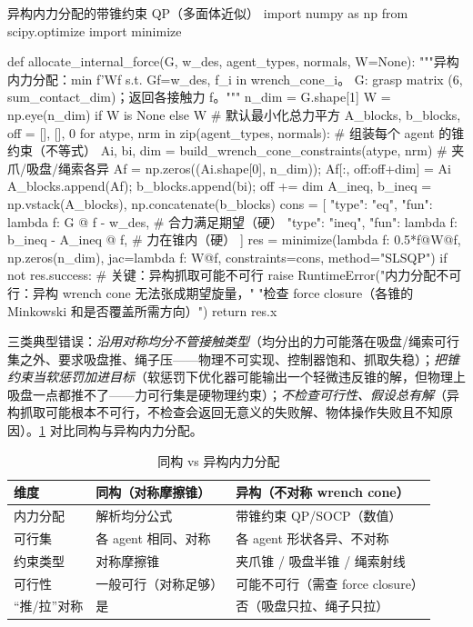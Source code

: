 \begin{codebox}[Python]{异构内力分配的带锥约束 QP（多面体近似）}
import numpy as np
from scipy.optimize import minimize

def allocate_internal_force(G, w_des, agent_types, normals, W=None):
    """异构内力分配：min f'Wf s.t. Gf=w_des, f_i in wrench_cone_i。
       G: grasp matrix (6, sum_contact_dim)；返回各接触力 f。"""
    n_dim = G.shape[1]
    W = np.eye(n_dim) if W is None else W            # 默认最小化总力平方
    A_blocks, b_blocks, off = [], [], 0
    for atype, nrm in zip(agent_types, normals):     # 组装每个 agent 的锥约束（不等式）
        Ai, bi, dim = build_wrench_cone_constraints(atype, nrm)  # 夹爪/吸盘/绳索各异
        Af = np.zeros((Ai.shape[0], n_dim)); Af[:, off:off+dim] = Ai
        A_blocks.append(Af); b_blocks.append(bi); off += dim
    A_ineq, b_ineq = np.vstack(A_blocks), np.concatenate(b_blocks)
    cons = [
        {"type": "eq",   "fun": lambda f: G @ f - w_des},        # 合力满足期望（硬）
        {"type": "ineq", "fun": lambda f: b_ineq - A_ineq @ f},  # 力在锥内（硬）
    ]
    res = minimize(lambda f: 0.5*f@W@f, np.zeros(n_dim), jac=lambda f: W@f,
                   constraints=cons, method="SLSQP")
    if not res.success:                              # 关键：异构抓取可能不可行
        raise RuntimeError("内力分配不可行：异构 wrench cone 无法张成期望旋量，"
                           "检查 force closure（各锥的 Minkowski 和是否覆盖所需方向）")
    return res.x
\end{codebox}

\noindent 三类典型错误：\emph{沿用对称均分不管接触类型}（均分出的力可能落在吸盘/绳索可行集之外、要求吸盘推、绳子压——物理不可实现、控制器饱和、抓取失稳）；\emph{把锥约束当软惩罚加进目标}（软惩罚下优化器可能输出一个轻微违反锥的解，但物理上吸盘一点都推不了——力可行集是硬物理约束）；\emph{不检查可行性、假设总有解}（异构抓取可能根本不可行，不检查会返回无意义的失败解、物体操作失败且不知原因）。\cref{tab:hmr-manip-compare} 对比同构与异构内力分配。

\begin{table}[H]\centering\small
\caption{同构 vs 异构内力分配}
\label{tab:hmr-manip-compare}
\begin{tabular}{lll}
\toprule
维度 & 同构（对称摩擦锥） & 异构（不对称 wrench cone） \\
\midrule
内力分配 & 解析均分公式 & 带锥约束 QP/SOCP（数值） \\
可行集 & 各 agent 相同、对称 & 各 agent 形状各异、不对称 \\
约束类型 & 对称摩擦锥 & 夹爪锥 / 吸盘半锥 / 绳索射线 \\
可行性 & 一般可行（对称足够） & 可能不可行（需查 force closure） \\
“推/拉”对称 & 是 & 否（吸盘只拉、绳子只拉） \\
\bottomrule
\end{tabular}
\end{table}

